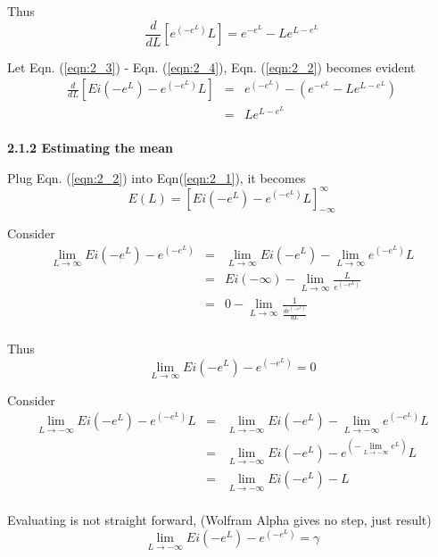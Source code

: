 \documentclass{beamer}
\begin{document}
Thus
\begin{equation}
\label{eqn:2_4}
\frac{d}{dL} \left[ e^{(-e^L)} L \right]  = e^{-e^L} - L  e^{L-e^L}
\end{equation}

Let Eqn. (\ref{eqn:2_3}) - Eqn. (\ref{eqn:2_4}), Eqn. (\ref{eqn:2_2}) becomes evident
\begin{eqnarray*}
\frac{d}{dL} \left[ Ei(-e^L) -  e^{(-e^L)}  L \right]
	&=& e^{(-e^L)} - \left( e^{-e^L} - L  e^{L-e^L} \right) \\
	&=& L  e^{L-e^L} \\
\end{eqnarray*}

\textbf{2.1.2 Estimating the mean}

Plug Eqn. (\ref{eqn:2_2}) into Eqn(\ref{eqn:2_1}), it becomes
\begin{equation}
\label{eqn:2_5}
E(L) = \left[ Ei(-e^L)-e^{(-e^L)} L \right]_{-\infty}^{\infty}
\end{equation}

Consider 
\begin{eqnarray*}
\lim_{L \to \infty}  {Ei(-e^L)-e^{(-e^L)} }
	&=& \lim_{L \to \infty} {Ei(-e^L)} - \lim_{L \to \infty}{e^{(-e^L)} L} \\
	&=& Ei(-\infty) - \lim_{L \to \infty}{ \frac{L}{e^{(-e^L)}} } \\
	&=& 0 - \lim_{L \to \infty}{ \frac{1}{ \frac{d e^{(-e^L)}}{dL} } } \\
\end{eqnarray*}

Thus
\begin{equation}
\label{eqn:2_6}
\lim_{L \to \infty}  {Ei(-e^L)-e^{(-e^L)} } = 0
\end{equation}

Consider 
\begin{eqnarray*}
\lim_{L \to -\infty}  {Ei(-e^L)-e^{(-e^L)} L }
	&=& \lim_{L \to -\infty} {Ei(-e^L)} - \lim_{L \to -\infty}{e^{(-e^L)} L} \\
	&=& \lim_{L \to -\infty} {Ei(-e^L)} - e^{ \left(-\displaystyle{ \lim_{L \to -\infty}{e^L} } \right)} L   \\
	&=& \lim_{L \to -\infty} {Ei(-e^L)} -  L   \\
\end{eqnarray*}

Evaluating is not straight forward, (Wolfram Alpha gives no step, just result)
\begin{equation}
\label{eqn:2_7}
\lim_{L \to -\infty}  {Ei(-e^L)-e^{(-e^L)} } = \gamma
\end{equation}
\end{document}
